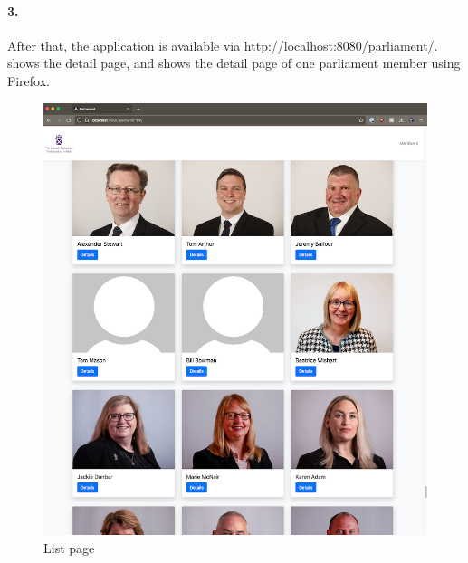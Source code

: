 \paragraph{3.}
After that, the application is available via \url{http://localhost:8080/parliament/}.  shows the detail page, and  shows the detail page of one parliament member using Firefox.

\newpage

\begin{figure}[h]
\centering
\includegraphics[scale=1]{images/03_depl/member-list}
\caption{List page}
\label{fig:subsubsec:03_depl_list}
\end{figure}

\newpage

